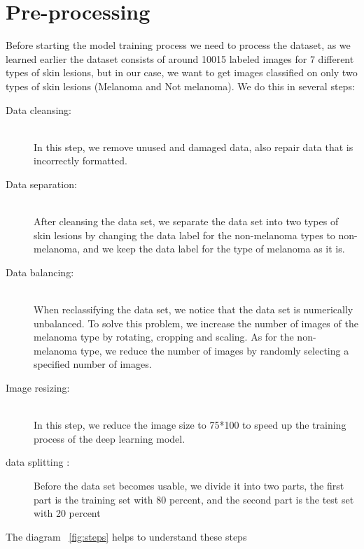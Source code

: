 \section{Pre-processing}
    Before starting the model training process we need to process the dataset, as we learned earlier the dataset consists of around 10015 labeled images for 7 different types of skin lesions, but in our case, we want to get images classified on only two types of skin lesions (Melanoma and Not melanoma). We do this in several steps:

    \begin{description}
        \item[Data cleansing: ] \hfill \\  In this step, we remove unused and damaged data, also repair data that is incorrectly formatted.

        \item[Data separation: ] \hfill \\  After cleansing the data set, we separate the data set into two types of skin lesions by changing the data label for the non-melanoma types to non-melanoma, and we keep the data label for the type of melanoma as it is.

        \item[Data balancing: ] \hfill \\  When reclassifying the data set, we notice that the data set is numerically unbalanced. To solve this problem, we increase the number of images of the melanoma type by rotating, cropping and scaling. As for the non-melanoma type, we reduce the number of images by randomly selecting a specified number of images.

        \item[Image resizing: ] \hfill \\  In this step, we reduce the image size to 75*100 to speed up the training process of the deep learning model. 
        \item[data splitting :] Before the data set becomes usable, we divide it into two parts, the first part is the training set with 80 percent, and the second part is the test set with 20 percent
    \end{description}

        The diagram ~\ref{fig:steps} helps to understand these steps

